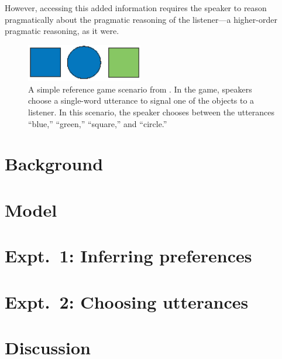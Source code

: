 \documentclass[10pt,a4paper]{article}
\begin{document}
However, accessing this added information requires the speaker to reason pragmatically about the pragmatic reasoning of the listener---a higher-order pragmatic reasoning, as it were.

\begin{figure}
	\centering
	\includegraphics[width=2in]{images/rsa_scene.eps}
	\caption{A simple reference game scenario from . In the game, speakers choose a single-word utterance to signal one of the objects to a listener. In this scenario, the speaker chooses between the utterances ``blue,'' ``green,'' ``square,'' and ``circle.''}\label{FG-ref-game}
	\end{figure}


\section{Background}

\cite{wasow2015}

\cite{piantadosietal2012}

\cite{frankgoodman2012,goodmanfrank2016}


\section{Model}


\section{Expt.~1: Inferring preferences}


\section{Expt.~2: Choosing utterances}


\section{Discussion}




\setlength{\bibleftmargin}{.125in}
\setlength{\bibindent}{-\bibleftmargin}


\end{document}
